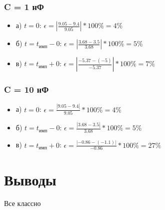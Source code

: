 \subsubsection{C = 1 нФ}
\begin{itemize}
\item[] а) $t = 0$: $\epsilon = |\frac{9.05 - 9.4}{ 9.05 }| * 100\% = 4 \%$

\item[] б) $t = t_\text{имп} - 0$: $\epsilon = |\frac{3.68 - 3.5}{ 3.68 }| * 100\% = 5 \%$

\item[] в) $t = t_\text{имп} + 0$: $\epsilon = |\frac{-5.37 - (-5)}{ -5.37 }| * 100\% = 7 \%$
\end{itemize}

\subsubsection{C = 10 нФ}
\begin{itemize}
\item[] а) $t = 0$: $\epsilon = \frac{| 9.05 - 9.4 |}{ 9.05 } * 100\% = 4 \%$

\item[] б) $t = t_\text{имп} - 0$: $\epsilon = \frac{| 3.68 - 3.5 |}{ 3.68 } * 100\% = 5 \%$

\item[] в) $t = t_\text{имп} + 0$: $\epsilon = \frac{| -0.86 - (-1.1) |}{ -0.86 } * 100\% = 27 \%$
\end{itemize}



  
\section{Выводы}
Все классно


